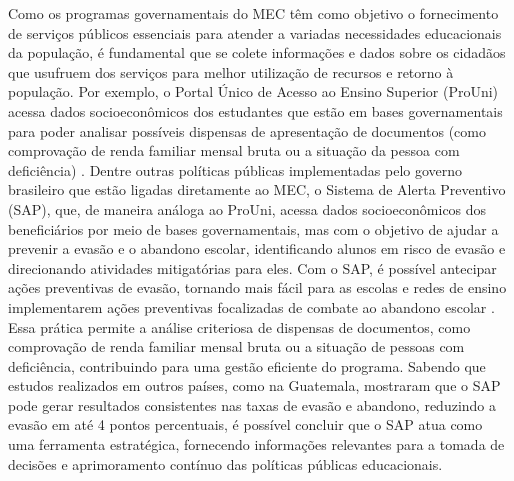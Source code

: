 Como os programas governamentais do MEC têm como objetivo o fornecimento de serviços públicos essenciais para atender a variadas necessidades educacionais da população, é fundamental que se colete informações e dados sobre os cidadãos que usufruem dos serviços para melhor utilização de recursos e retorno à população. Por exemplo, o Portal Único de Acesso ao Ensino Superior (ProUni) acessa dados socioeconômicos dos estudantes que estão em bases governamentais para poder analisar possíveis dispensas de apresentação de documentos (como comprovação de renda familiar mensal bruta ou a situação da pessoa com deficiência) \cite{PROUni:2005}. Dentre outras políticas públicas implementadas pelo governo brasileiro que estão ligadas diretamente ao MEC, o Sistema de Alerta Preventivo (SAP), que, de maneira análoga ao ProUni, acessa dados socioeconômicos dos beneficiários por meio de bases governamentais, mas com o objetivo de ajudar a prevenir a evasão e o abandono escolar, identificando alunos em risco de evasão e direcionando atividades mitigatórias para eles. Com o SAP, é possível antecipar ações preventivas de evasão, tornando mais fácil para as escolas e redes de ensino implementarem ações preventivas focalizadas de combate ao abandono escolar \cite{sap}. Essa prática permite a análise criteriosa de dispensas de documentos, como comprovação de renda familiar mensal bruta ou a situação de pessoas com deficiência, contribuindo para uma gestão eficiente do programa. Sabendo que estudos realizados em outros países, como na Guatemala, mostraram que o SAP pode gerar resultados consistentes nas taxas de evasão e abandono, reduzindo a evasão em até 4 pontos percentuais, é possível concluir que o SAP atua como uma ferramenta estratégica, fornecendo informações relevantes para a tomada de decisões e aprimoramento contínuo das políticas públicas educacionais. %

